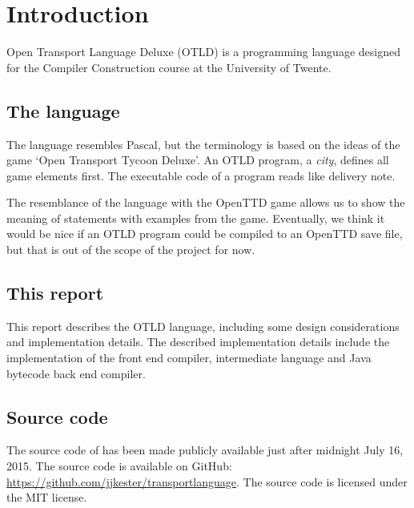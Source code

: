 \chapter{Introduction}

Open Transport Language Deluxe (OTLD) is a programming language designed for the Compiler Construction course at the University of Twente.

\section{The language}

The language resembles Pascal, but the terminology is based on the ideas of the game `Open Transport Tycoon Deluxe'.
An OTLD program, a \emph{city}, defines all game elements first. The executable code of a program reads like delivery note.

The resemblance of the language with the OpenTTD game allows us to show the meaning of statements with examples from the game. Eventually, we think it would be nice if an OTLD program could be compiled to an OpenTTD save file, but that is out of the scope of the project for now.

\section{This report}

This report describes the OTLD language, including some design considerations and implementation details. The described implementation details include the implementation of the front end compiler, intermediate language and Java bytecode back end compiler.

\section{Source code}

The source code of \name has been made publicly available just after midnight July 16, 2015. The source code is available on GitHub: \url{https://github.com/jjkester/transportlanguage}. The source code is licensed under the MIT license.
